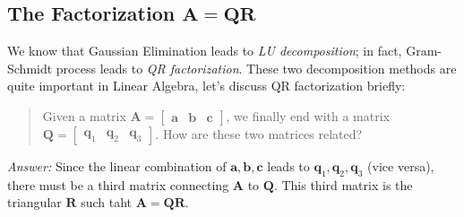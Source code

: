 \subsection[The Factorization $A=QR$.]{The Factorization $\bm A=\bm{QR}$}
We know that Gaussian Elimination leads to \textit{LU decomposition}; in fact, Gram-Schmidt process leads to \textit{QR factorization}. These two decomposition methods are quite important in Linear Algebra, let's discuss QR factorization briefly:
\begin{quotation}
Given a matrix $\bm A=\begin{bmatrix}
\bm a&\bm b&\bm c
\end{bmatrix}$, we finally end with a matrix $\bm Q=\begin{bmatrix}
\bm q_1&\bm q_2&\bm q_3
\end{bmatrix}$. How are these two matrices related?
\end{quotation}
\textit{Answer:} Since the linear combination of $\bm a,\bm b,\bm c$ leads to $\bm q_1,\bm q_2,\bm q_3$ (vice versa), there must be a third matrix connecting $\bm A$ to $\bm Q$. This third matrix is the triangular $\bm R$ such taht $\bm A=\bm{QR}$.

